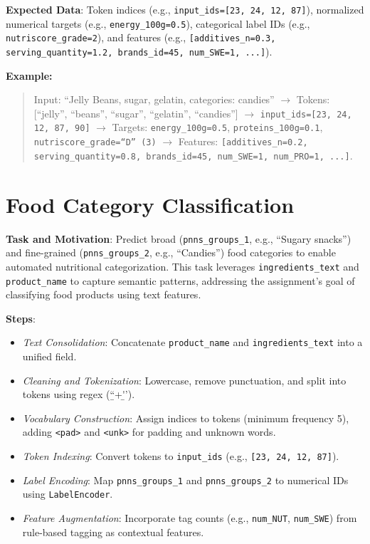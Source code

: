 \documentclass[11pt]{article}
\begin{document}
\textbf{Expected Data}: Token indices (e.g., \texttt{input\_ids=[23, 24, 12, 87]}), normalized numerical targets (e.g., \texttt{energy\_100g=0.5}), categorical label IDs (e.g., \texttt{nutriscore\_grade=2}), and features (e.g., \texttt{[additives\_n=0.3, serving\_quantity=1.2, brands\_id=45, num\_SWE=1, ...]}).

\textbf{Example:}
\begin{quote}
Input: ``Jelly Beans, sugar, gelatin, categories: candies'' $\to$ Tokens: [``jelly'', ``beans'', ``sugar'', ``gelatin'', ``candies''] $\to$ \texttt{input\_ids=[23, 24, 12, 87, 90]} $\to$ Targets: \texttt{energy\_100g=0.5}, \texttt{proteins\_100g=0.1}, \texttt{nutriscore\_grade=``D'' (3)} $\to$ Features: \texttt{[additives\_n=0.2, serving\_quantity=0.8, brands\_id=45, num\_SWE=1, num\_PRO=1, ...]}.
\end{quote}


\section{Food Category Classification}

\textbf{Task and Motivation}: Predict broad (\texttt{pnns\_groups\_1}, e.g., ``Sugary snacks'') and fine-grained (\texttt{pnns\_groups\_2}, e.g., ``Candies'') food categories to enable automated nutritional categorization. This task leverages \texttt{ingredients\_text} and \texttt{product\_name} to capture semantic patterns, addressing the assignment’s goal of classifying food products using text features.

\textbf{Steps}:
\begin{itemize}[noitemsep]
    \item \textit{Text Consolidation}: Concatenate \texttt{product\_name} and \texttt{ingredients\_text} into a unified field.
    \item \textit{Cleaning and Tokenization}: Lowercase, remove punctuation, and split into tokens using regex (``\string\b\string\w+\string\b'').
    \item \textit{Vocabulary Construction}: Assign indices to tokens (minimum frequency 5), adding \texttt{<pad>} and \texttt{<unk>} for padding and unknown words.
    \item \textit{Token Indexing}: Convert tokens to \texttt{input\_ids} (e.g., \texttt{[23, 24, 12, 87]}).
    \item \textit{Label Encoding}: Map \texttt{pnns\_groups\_1} and \texttt{pnns\_groups\_2} to numerical IDs using \texttt{LabelEncoder}.
    \item \textit{Feature Augmentation}: Incorporate tag counts (e.g., \texttt{num\_NUT}, \texttt{num\_SWE}) from rule-based tagging as contextual features.
\end{itemize}
\end{document}
